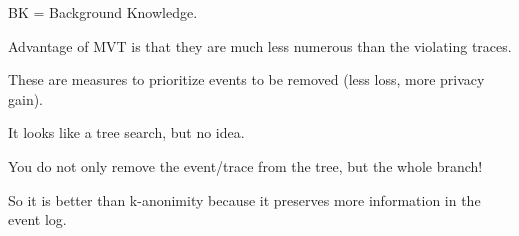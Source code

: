 BK = Background Knowledge.

\nextslides

\nextslides

\nextslides[until=31] 

\nextslides

\nextslides

\nextslides

Advantage of MVT is that they are much less numerous than the violating traces.

\nextslides

\nextslides

These are measures to prioritize events to be removed (less loss, more privacy gain).

\nextslides[until=44] 

It looks like a tree search, but no idea.

You do not only remove the event/trace from the tree, but the whole branch!

\nextslides

So it is better than k-anonimity because it preserves more information in the event log.

\nextslides


